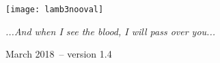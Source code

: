\documentclass[10pt,oneside,footinclude=true,headinclude=true]{scrbook} %
\begin{document}
\begin{titlepage}
\begin{center}
\large \hfill \vfill

\begingroup
\color{RoyalPurple} \\
\bigskip
\color{RoyalPurple} \\ %
\bigskip
\endgroup

\bigskip\bigskip
\bigskip\bigskip
\bigskip
\texttt{[image: lamb3nooval]} \\
\bigskip
\bigskip\bigskip

\textit{...And when I see the blood, I will pass over you...} \\ \medskip %

March 2018\ -- version 1.4 %

\vfill
\end{center}
\end{titlepage}
    
\end{document}
